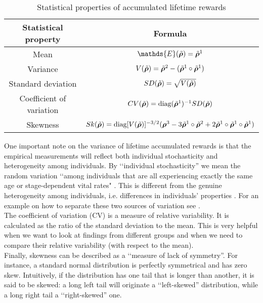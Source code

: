 \documentclass[\main/main.tex]{subfiles}
\begin{document}
\begin{table*}[h!]
\centering
{}
\begin{tabular}{cc}
\toprule
    {Statistical property} & {Formula} \\ \midrule
    Mean  & $\mathds{E}(\Tilde{\bm{\rho}}) = \Tilde{\bm{\rho}}^1$     \\
    Variance  & $V(\Tilde{\bm{\rho}}) =  \Tilde{\bm{\rho}}^2 - (\Tilde{\bm{\rho}}^1 \circ \Tilde{\bm{\rho}}^1) $\\
    Standard deviation &  $SD(\Tilde{\bm{\rho}})   =  \sqrt{V(\Tilde{\bm{\rho}})}$  \\
    Coefficient of variation &  $CV (\Tilde{\bm{\rho}}) = \text{diag} (\Tilde{\bm{\rho}}^1)^{-1} SD(\Tilde{\bm{\rho}})$  \\ 
    Skewness  &  $Sk( \Tilde{\bm{\rho}}) = \text{diag} [ V(\Tilde{\bm{\rho}})]^{-3/2} (\bm{\rho}^3 - 3 \Tilde{\bm{\rho}}^1 \circ \Tilde{\bm{\rho}}^2 + 2\Tilde{\bm{\rho}}^1 \circ \Tilde{\bm{\rho}}^1 \circ \Tilde{\bm{\rho}}^1)$\\ 
    \bottomrule
\end{tabular}
\caption{Statistical properties of accumulated lifetime rewards}
\end{table*} 


One important note on the variance of lifetime accumulated rewards is that the empirical measurements will reflect both individual stochasticity and heterogeneity among individuals. By \lq\lq individual stochasticity'' we mean the random variation \lq\lq among individuals that are all experiencing exactly the same age or stage-dependent vital rates" \citep{Caswell2015}. This is different from the genuine heterogeneity among individuals, i.e. differences in individuals' properties \citep{Hartemink2017a, Caswell2011}. For an example on how to separate these two sources of variation see \cite{Caswell2001, Caswell2014}.\\

The coefficient of variation (CV) is a measure of relative variability. It is calculated as the ratio of the standard deviation to the mean. This is very helpful when we want to look at findings from different groups and when we need to compare their relative variability (with respect to the mean).\\
Finally, skewness can be described as a \lq\lq measure of lack of symmetry''. For instance, a standard normal distribution is perfectly symmetrical and has zero skew. Intuitively, if the distribution has one tail that is longer than another, it is said to be skewed: a  long left tail will originate a \lq\lq left-skewed'' distribution, while a long right tail a \lq\lq right-skewed'' one.
\end{document}
